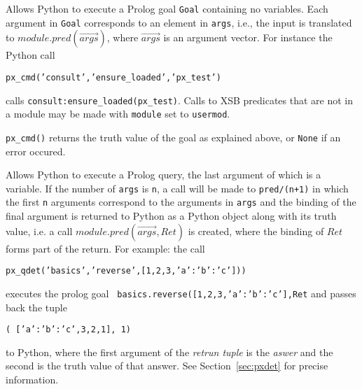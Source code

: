 \begin{description}

%
  Allows Python to execute a Prolog goal {\tt Goal} containing no
  variables.  Each argument in {\tt Goal} corresponds to an element
  in {\tt args}, i.e., the input is translated to
  $module.pred(\vec{args})$, where $\vec{args}$ is an argument vector.
  For instance the Python call

  {\tt px\_cmd('consult','ensure\_loaded','px\_test')}

  calls {\tt consult:ensure\_loaded(px\_test)}.  Calls to XSB
  predicates that are not in a module may be made with {\tt module}
  set to {\tt usermod}.

  {\tt px\_cmd()} returns the truth value of the goal as explained
  above, or {\tt None} if an error occured.
  
%
  Allows Python to execute a Prolog query, the last argument of which
  is a variable.  If the number of {\tt args} is {\tt n}, a call will
  be made to {\tt pred/(n+1)} in which the first {\tt n} arguments
  correspond to the arguments in {\tt args} and the binding of the 
  final argument is returned to Python as a Python object along with
  its truth value, i.e. a call $module.pred(\vec{args},Ret)$ is
  created, where the binding of $Ret$ forms part of the return.  For
  example: the call

  {\tt px\_qdet('basics','reverse',[1,2,3,{'a':{'b':'c'}}]))}

  \noindent
  executes the prolog goal {\tt
    basics.reverse([1,2,3,{'a':{'b':'c'}}],Ret} and passes back the tuple

  {\tt ( [{'a':{'b':'c'}},3,2,1], 1)}

  \noindent
  to Python, where the first argument of the {\em retrun tuple} is the
  {\em aswer} and the second is the truth value of that answer.  See
  Section~\ref{sec:pxdet} for precise information.


\end{description}
